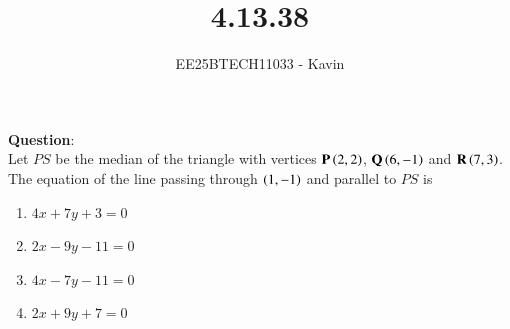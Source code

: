 \documentclass[journal]{IEEEtran}
\begin{document}

\vspace{3cm}

\title{4.13.38}
\author{EE25BTECH11033 - Kavin}
{\let\newpage\relax\maketitle}

\renewcommand{\thefigure}{\theenumi}
\renewcommand{\thetable}{\theenumi}
\setlength{\intextsep}{10pt} %
\textbf{Question}:\\
Let $PS$ be the median of the triangle with vertices $\mathbf{P}\left(2, 2\right)$, $\mathbf{Q}\left(6, -1\right)$ and $\mathbf{R}\left(7,3\right)$. The equation of the line passing through $\left(1, -1\right)$ and parallel to $PS$ is 
\begin{multicols}{2}
\begin{enumerate}
\item $4x+7y+3=0$
\item $2x-9y-11=0$
\item $4x-7y-11=0$
\item $2x+9y+7=0$
\end{enumerate}
\end{multicols}
\bigskip
\end{document}
